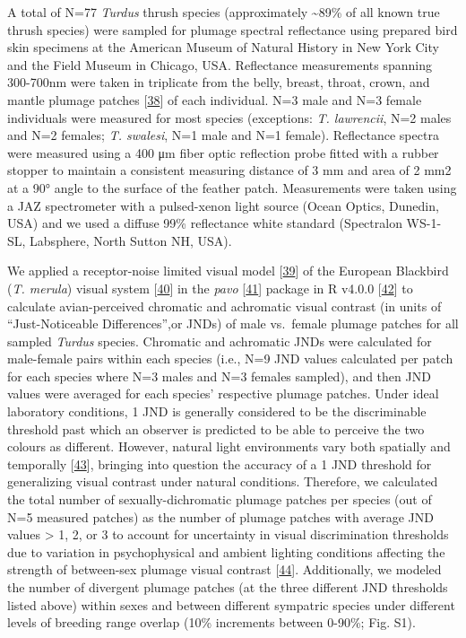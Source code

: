 \documentclass[
  a4paper,
]{article}
\begin{document}
A total of N=77 \emph{Turdus} thrush species (approximately
\textasciitilde89\% of all known true thrush species) were sampled for
plumage spectral reflectance using prepared bird skin specimens at the
American Museum of Natural History in New York City and the Field Museum
in Chicago, USA. Reflectance measurements spanning 300-700nm were taken
in triplicate from the belly, breast, throat, crown, and mantle plumage
patches {[}\protect\hyperlink{ref-andersson2006}{38}{]} of each
individual. N=3 male and N=3 female individuals were measured for most
species (exceptions: \emph{T. lawrencii}, N=2 males and N=2 females;
\emph{T. swalesi}, N=1 male and N=1 female). Reflectance spectra were
measured using a 400 μm fiber optic reflection probe fitted with a
rubber stopper to maintain a consistent measuring distance of 3 mm and
area of 2 mm2 at a 90° angle to the surface of the feather patch.
Measurements were taken using a JAZ spectrometer with a pulsed-xenon
light source (Ocean Optics, Dunedin, USA) and we used a diffuse 99\%
reflectance white standard (Spectralon WS-1-SL, Labsphere, North Sutton
NH, USA).

We applied a receptor-noise limited visual model
{[}\protect\hyperlink{ref-vorobyev1998}{39}{]} of the European Blackbird
(\emph{T. merula}) visual system
{[}\protect\hyperlink{ref-hart2000}{40}{]} in the \emph{pavo}
{[}\protect\hyperlink{ref-maia2019}{41}{]}⁠ package in R v4.0.0
{[}\protect\hyperlink{ref-rcoreteam2020}{42}{]}⁠ to calculate
avian-perceived chromatic and achromatic visual contrast (in units of
``Just-Noticeable Differences'',or JNDs) of male vs.~female plumage
patches for all sampled \emph{Turdus} species. Chromatic and achromatic
JNDs were calculated for male-female pairs within each species (i.e.,
N=9 JND values calculated per patch for each species where N=3 males and
N=3 females sampled), and then JND values were averaged for each
species' respective plumage patches. Under ideal laboratory conditions,
1 JND is generally considered to be the discriminable threshold past
which an observer is predicted to be able to perceive the two colours as
different. However, natural light environments vary both spatially and
temporally {[}\protect\hyperlink{ref-endler1993}{43}{]}⁠, bringing into
question the accuracy of a 1 JND threshold for generalizing visual
contrast under natural conditions. Therefore, we calculated the total
number of sexually-dichromatic plumage patches per species (out of N=5
measured patches) as the number of plumage patches with average JND
values \textgreater{} 1, 2, or 3 to account for uncertainty in visual
discrimination thresholds due to variation in psychophysical and ambient
lighting conditions affecting the strength of between-sex plumage visual
contrast {[}\protect\hyperlink{ref-kemp2015}{44}{]}⁠. Additionally, we
modeled the number of divergent plumage patches (at the three different
JND thresholds listed above) within sexes and between different
sympatric species under different levels of breeding range overlap (10\%
increments between 0-90\%; Fig. S1).
\end{document}
